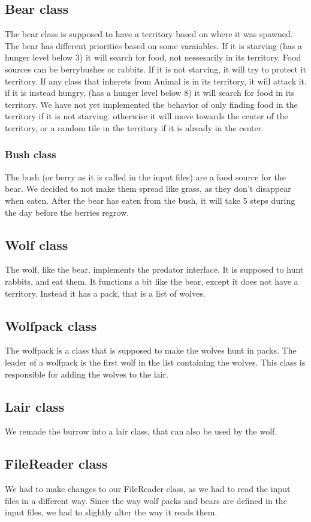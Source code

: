 \documentclass[11pt]{article}
\begin{document}
    \subsection*{Bear class}
    The bear class is supposed to have a territory based on where it was spawned. The bear has different priorities based on some varaiables. 
    If it is starving (has a hunger level below 3) it will search for food, not nessesarily in its territory. Food sources can be berrybushes or rabbits. 
    If it is not starving, it will try to protect it territory. If any class that inherets from Animal is in its territory, it will attack it. 
    if it is instead hungry, (has a hunger level below 8) it will search for food in its territory. We have not yet implemented the behavior of only 
    finding food in the territory if it is not starving. otherwise it will move towards the center of the territory, or a random tile in the territory if 
    it is already in the center.
    \subsubsection*{Bush class}
    The bush (or berry as it is called in the input files) are a food source for the bear. We decided to not make them spread like grass, as they don't 
    disappear when eaten. After the bear has eaten from the bush, it will take 5 steps during the day before the berries regrow.
    \subsection*{Wolf class}
    The wolf, like the bear, implements the predator interface. It is supposed to hunt rabbits, and eat them. It functions a bit like the bear, except 
    it does not have a territory. Instead it has a pack, that is a list of wolves.
    \subsection*{Wolfpack class}
    The wolfpack is a class that is supposed to make the wolves hunt in packs. The leader of a wolfpack is the first wolf in the list 
    containing the wolves. This class is responsible for adding the wolves to the lair. 
    \subsection*{Lair class}
    We remade the burrow into a lair class, that can also be used by the wolf. 
    \subsection*{FileReader class}
    We had to make changes to our FileReader class, as we had to read the input files in a different way. Since the way wolf packs 
    and bears are defined in the input files, we had to slightly alter the way it reads them. 
\end{document}

